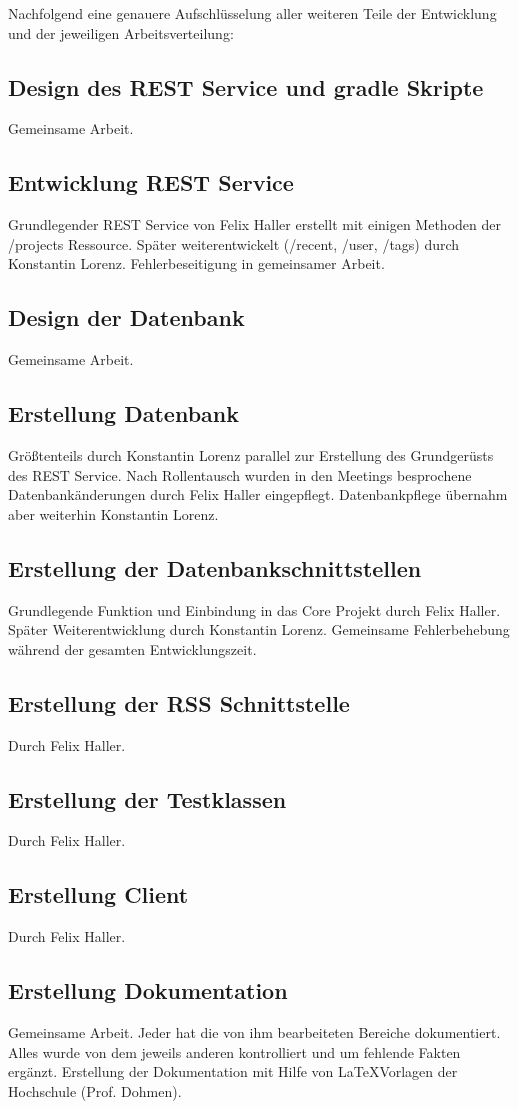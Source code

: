 \documentclass[12pt]{scrartcl}
\begin{document}
		Nachfolgend eine genauere Aufschlüsselung aller weiteren Teile der Entwicklung und der jeweiligen Arbeitsverteilung:
	 
		
		\subsection{Design des REST Service und gradle Skripte}
			Gemeinsame Arbeit.
		\subsection{Entwicklung REST Service}
			Grundlegender REST Service von Felix Haller erstellt mit einigen Methoden der /projects Ressource. Später weiterentwickelt (/recent, /user, /tags) durch Konstantin Lorenz. Fehlerbeseitigung in gemeinsamer Arbeit. 
		\subsection{Design der Datenbank}
			Gemeinsame Arbeit.
		\subsection{Erstellung Datenbank}
			Größtenteils durch Konstantin Lorenz parallel zur Erstellung des Grundgerüsts des REST Service. Nach Rollentausch wurden in den Meetings besprochene Datenbankänderungen durch Felix Haller eingepflegt. Datenbankpflege übernahm aber weiterhin Konstantin Lorenz.
		\subsection{Erstellung der Datenbankschnittstellen}
			Grundlegende Funktion und Einbindung in das Core Projekt durch Felix Haller. Später Weiterentwicklung durch Konstantin Lorenz. Gemeinsame Fehlerbehebung während der gesamten Entwicklungszeit.
		\subsection{Erstellung der RSS Schnittstelle}
			Durch Felix Haller.
		\subsection{Erstellung der Testklassen}
			Durch Felix Haller.
		\subsection{Erstellung Client}
			Durch Felix Haller.
		\subsection{Erstellung Dokumentation}
			Gemeinsame Arbeit. Jeder hat die von ihm bearbeiteten Bereiche dokumentiert. Alles wurde von dem jeweils anderen kontrolliert und um fehlende Fakten ergänzt. Erstellung der Dokumentation mit Hilfe von \LaTeX Vorlagen der Hochschule (Prof. Dohmen).
	
\end{document}
